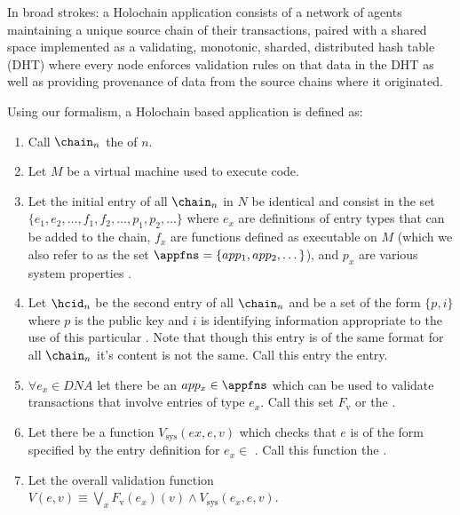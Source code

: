 \documentclass[twocolumn,showpacs,%
  nofootinbib,aps,superscriptaddress,%
  eqsecnum,prd,notitlepage,showkeys,10pt]{revtex4-1}
\begin{document}
In broad strokes: a Holochain application consists of a network of agents maintaining a unique source chain of their transactions, paired with a shared space implemented as a validating, monotonic, sharded, distributed hash table (DHT) where every node enforces validation rules on that data in the DHT as well as providing provenance of data from the source chains where it originated.

Using our formalism, a Holochain based application \shc is defined as:

\begin{enumerate}

\item Call $\chain_n$ the  of $n$.

\item Let $M$ be a virtual machine used to execute code.

\item Let the initial entry of all $\chain_n$ in $N$ be identical and consist in the set \hcdna $\{e_1,e_2,\dots,f_1,f_2,\dots,p_1,p_2,\dots\}$ where $e_x$ are definitions of entry types that can be added to the chain, $f_x$ are functions defined as executable on $M$ (which we also refer to as the set $\appfns = \{app_1,app_2,\dots\}$), and $p_x$ are various system properties .

\item Let $\hcid_n$ be the second entry of all $\chain_n$ and be a set of the form $\{p,i\}$ where $p$ is the public key and $i$ is identifying information appropriate to the use of this particular \shc. Note that though this entry is of the same format for all $\chain_n$ it's content is not the same. Call this entry the  entry.

\item $\forall e_x \in DNA$ let there be an $app_x \in \appfns$ which can be used to validate transactions that involve entries of type $e_x$.  Call this set $F_\mathrm{v}$ or the .

\item Let there be a function $V_\mathrm{sys}(ex,e,v)$ which checks that $e$ is of the form specified by the entry definition for $e_x \in$ \hcdna.  Call this function the .

\item Let the overall validation function $V(e,v) \equiv \bigvee_x  F_\mathrm{v}(e_x)(v) \wedge V_\mathrm{sys}(e_x,e,v)$.


\end{enumerate}
\end{document}

